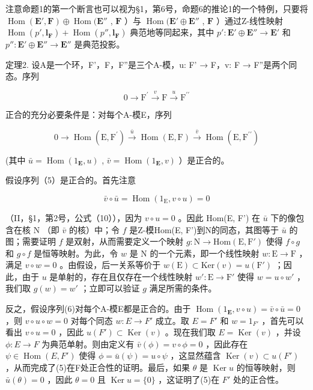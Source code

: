 注意命题1的第一个断言也可以视为§1，第6号，命题6的推论1的一个特例，只要将 \(\operatorname{Hom}(\mathbf{E}',\mathbf{F}) \oplus \operatorname{Hom}(\mathbf{E}''\) , \(\mathbf{F}\) ）与 \(\operatorname{Hom}(\mathbf{E}' \oplus \mathbf{E}''\) , \(\mathbf{F}\) ）通过Z-线性映射 \(\operatorname{Hom}(p',\mathbf{l}_{\mathbf{F}}) + \operatorname{Hom}(p'',\mathbf{l}_{\mathbf{F}})\) 典范地等同起来，其中 \(p':\mathbf{E}' \oplus \mathbf{E}'' \to \mathbf{E}'\) 和 \(p'':\mathbf{E}' \oplus \mathbf{E}'' \to \mathbf{E}''\) 是典范投影。

定理2. 设A是一个环，F'，F，F''是三个A-模，u: F' → F，v: F → F''是两个同态。序列

\[
0 \longrightarrow \mathrm{F} ^ {\prime} \stackrel {v} {\longrightarrow} \mathrm{F} \stackrel {u} {\longrightarrow} \mathrm{F} ^ {\prime \prime}\tag{5}
\]

正合的充分必要条件是：对每个A-模E，序列

\[
0 \longrightarrow \operatorname{Hom} (\mathrm{E}, \mathrm{F} ^ {\prime}) \stackrel {\bar {u}} {\longrightarrow} \operatorname{Hom} (\mathrm{E}, \mathrm{F}) \stackrel {\bar {v}} {\longrightarrow} \operatorname{Hom} (\mathrm{E}, \mathrm{F} ^ {\prime \prime})\tag{6}
\]

(其中 \(\bar{u} = \operatorname{Hom}(1_{\mathbf{E}}, u)\) , \(\bar{v} = \operatorname{Hom}(1_{\mathbf{E}}, v)\) ）是正合的。

假设序列（5）是正合的。首先注意

\[
\bar {v} \circ \bar {u} = \operatorname{Hom} (1 _ {\mathrm{E}}, v \circ u) = 0
\]

（II，§1，第2号，公式（10）），因为 \(v \circ u = 0\) 。因此 Hom(E, F') 在 \(\bar{u}\) 下的像包含在核 N （即 \(\bar{v}\) 的核）中；令 \(f\) 是Z-模Hom(E, F')到N的同态，其图等于 \(\bar{u}\) 的图；需要证明 \(f\) 是双射，从而需要定义一个映射 \(g: \mathrm{N} \to \mathrm{Hom}(\mathrm{E}, \mathrm{F}')\) 使得 \(f \circ g\) 和 \(g \circ f\) 是恒等映射。为此，令 \(w\) 是 N 的一个元素，即一个线性映射 \(w: \mathrm{E} \to \mathrm{F}\) ，满足 \(v \circ w = 0\) 。由假设，后一关系等价于 \(w(\mathrm{E}) \subset \mathrm{Ker}(v) = u(\mathrm{F}')\) ；因此，由于 \(u\) 是单射的，存在且仅存在一个线性映射 \(w': \mathrm{E} \to \mathrm{F}'\) 使得 \(w = u \circ w'\) ，我们取 \(g(w) = w'\) ；立即可以验证 \(g\) 满足所需的条件。

反之，假设序列(6)对每个A-模E都是正合的。由于 \(\operatorname{Hom}(1_{\mathbf{E}}, v \circ u) = \bar{v} \circ \bar{u} = 0\) ，则 \(v \circ u \circ w = 0\) 对每个同态 \(w: E \to F'\) 成立。取 \(E = F'\) 和 \(w = 1_{F'}\) ，首先可以看出 \(v \circ u = 0\) ，因此 \(u(F') \subset \operatorname{Ker}(v)\) 。现在我们取 \(E = \operatorname{Ker}(v)\) ，并设 \(\phi: E \to F\) 为典范单射。则由定义有 \(\bar{v}(\phi) = v \circ \phi = 0\) ，因此存在 \(\psi \in \operatorname{Hom}(E, F')\) 使得 \(\phi = \bar{u}(\psi) = u \circ \psi\) ，这显然蕴含 \(\operatorname{Ker}(v) \subset u(F')\) ，从而完成了(5)在F处正合性的证明。最后，如果 \(\theta\) 是 \(\operatorname{Ker} u\) 的恒等映射，则 \(\bar{u}(\theta) = 0\) ，因此 \(\theta = 0\) 且 \(\operatorname{Ker} u = \{0\}\) ，这证明了(5)在 \(F'\) 处的正合性。

